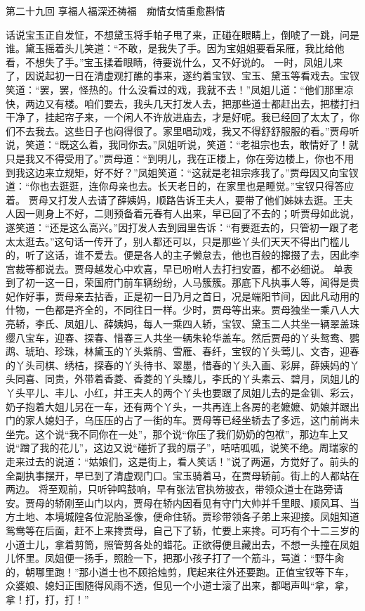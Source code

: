 \documentclass[12pt,oneside]{book}
\begin{document}
 
第二十九回  享福人福深还祷福　痴情女情重愈斟情


话说宝玉正自发怔，不想黛玉将手帕子甩了来，正碰在眼睛上，倒唬了一跳，问是谁。黛玉摇着头儿笑道：“不敢，是我失了手。因为宝姐姐要看呆雁，我比给他看，不想失了手。”宝玉揉着眼睛，待要说什么，又不好说的。
一时，凤姐儿来了，因说起初一日在清虚观打醮的事来，遂约着宝钗、宝玉、黛玉等看戏去。宝钗笑道：“罢，罢，怪热的。什么没看过的戏，我就不去！”凤姐儿道：“他们那里凉快，两边又有楼。咱们要去，我头几天打发人去，把那些道士都赶出去，把楼打扫干净了，挂起帘子来，一个闲人不许放进庙去，才是好呢。我已经回了太太了，你们不去我去。这些日子也闷得很了。家里唱动戏，我又不得舒舒服服的看。”贾母听说，笑道：“既这么着，我同你去。”凤姐听说，笑道：“老祖宗也去，敢情好了！就只是我又不得受用了。”贾母道：“到明儿，我在正楼上，你在旁边楼上，你也不用到我这边来立规矩，好不好？”凤姐笑道：“这就是老祖宗疼我了。”贾母因又向宝钗道：“你也去逛逛，连你母亲也去。长天老日的，在家里也是睡觉。”宝钗只得答应着。
贾母又打发人去请了薛姨妈，顺路告诉王夫人，要带了他们姊妹去逛。王夫人因一则身上不好，二则预备着元春有人出来，早已回了不去的；听贾母如此说，遂笑道：“还是这么高兴。”因打发人去到园里告诉：“有要逛去的，只管初一跟了老太太逛去。”这句话一传开了，别人都还可以，只是那些丫头们天天不得出门槛儿的，听了这话，谁不爱去。便是各人的主子懒怠去，他也百般的撺掇了去，因此李宫裁等都说去。贾母越发心中欢喜，早已吩咐人去打扫安置，都不必细说。
单表到了初一这一日，荣国府门前车辆纷纷，人马簇簇。那底下凡执事人等，闻得是贵妃作好事，贾母亲去拈香，正是初一日乃月之首日，况是端阳节间，因此凡动用的什物，一色都是齐全的，不同往日一样。少时，贾母等出来。贾母独坐一乘八人大亮轿，李氏、凤姐儿、薛姨妈，每人一乘四人轿，宝钗、黛玉二人共坐一辆翠盖珠缨八宝车，迎春、探春、惜春三人共坐一辆朱轮华盖车。然后贾母的丫头鸳鸯、鹦鹉、琥珀、珍珠，林黛玉的丫头紫鹃、雪雁、春纤，宝钗的丫头莺儿、文杏，迎春的丫头司棋、绣桔，探春的丫头待书、翠墨，惜春的丫头入画、彩屏，薛姨妈的丫头同喜、同贵，外带着香菱、香菱的丫头臻儿，李氏的丫头素云、碧月，凤姐儿的丫头平儿、丰儿、小红，并王夫人的两个丫头也要跟了凤姐儿去的是金钏、彩云，奶子抱着大姐儿另在一车，还有两个丫头，一共再连上各房的老嬷嬷、奶娘并跟出门的家人媳妇子，乌压压的占了一街的车。贾母等已经坐轿去了多远，这门前尚未坐完。这个说“我不同你在一处”，那个说“你压了我们奶奶的包袱”，那边车上又说“蹭了我的花儿”，这边又说“碰折了我的扇子”，咭咭呱呱，说笑不绝。周瑞家的走来过去的说道：“姑娘们，这是街上，看人笑话！”说了两遍，方觉好了。前头的全副执事摆开，早已到了清虚观门口。宝玉骑着马，在贾母轿前。街上的人都站在两边。
将至观前，只听钟鸣鼓响，早有张法官执笏披衣，带领众道士在路旁请安。贾母的轿刚至山门以内，贾母在轿内因看见有守门大帅并千里眼、顺风耳、当方土地、本境城隍各位泥胎圣像，便命住轿。贾珍带领各子弟上来迎接。凤姐知道鸳鸯等在后面，赶不上来搀贾母，自己下了轿，忙要上来搀。可巧有个十二三岁的小道士儿，拿着剪筒，照管剪各处的蜡花。正欲得便且藏出去，不想一头撞在凤姐儿怀里。凤姐便一扬手，照脸一下，把那小孩子打了一个筋斗，骂道：“野牛肏的，朝哪里跑！”那小道士也不顾拾烛剪，爬起来往外还要跑。正值宝钗等下车，众婆娘、媳妇正围随得风雨不透，但见一个小道士滚了出来，都喝声叫“拿，拿，拿！打，打，打！”
\end{document}
